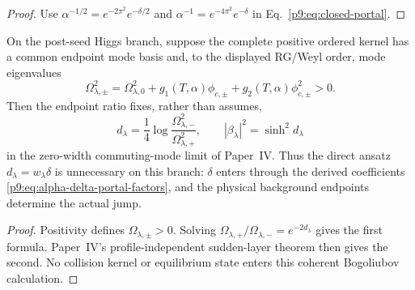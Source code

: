 \documentclass[12pt,a4paper]{article}
\begin{document}
\begin{proof}
Use \(\alpha^{-1/2}=e^{-2\pi^2}e^{-\delta/2}\) and
\(\alpha^{-1}=e^{-4\pi^2}e^{-\delta}\) in
Eq.~\eqref{p9:eq:closed-portal}.
\end{proof}

\begin{theorem}
\label{p9:thm:higgs-mode-jump-squeeze-bridge}
On the post-seed Higgs branch, suppose the complete positive ordered kernel
has a common endpoint mode basis and, to the displayed RG/Weyl order, mode
eigenvalues
\begin{equation}
\label{p9:eq:higgs-mode-kernel-endpoints}
 \Omega_{\lambda,\pm}^{2}
 =\Omega_{\lambda,0}^{2}
  +g_1(T,\alpha)\phi_{c,\pm}
  +g_2(T,\alpha)\phi_{c,\pm}^{2}>0.
\end{equation}
Then the endpoint ratio fixes, rather than assumes,
\begin{equation}
\label{p9:eq:higgs-derived-mode-jump}
 \boxed{
 d_\lambda
 =\frac14\log\frac{\Omega_{\lambda,-}^{2}}
                         {\Omega_{\lambda,+}^{2}},
 \qquad
 |\beta_\lambda|^2=\sinh^2d_\lambda}
\end{equation}
in the zero-width commuting-mode limit of Paper~IV.  Thus the direct ansatz
\(d_\lambda=w_\lambda\delta\) is unnecessary on this branch: \(\delta\)
enters through the derived coefficients
\eqref{p9:eq:alpha-delta-portal-factors}, and the physical background
endpoints determine the actual jump.
\end{theorem}

\begin{proof}
Positivity defines \(\Omega_{\lambda,\pm}>0\).  Solving
\(\Omega_{\lambda,+}/\Omega_{\lambda,-}=e^{-2d_\lambda}\) gives the first
formula.  Paper~IV's profile-independent sudden-layer theorem then gives the
second.  No collision kernel or equilibrium state enters this coherent
Bogoliubov calculation.
\end{proof}
\end{document}
